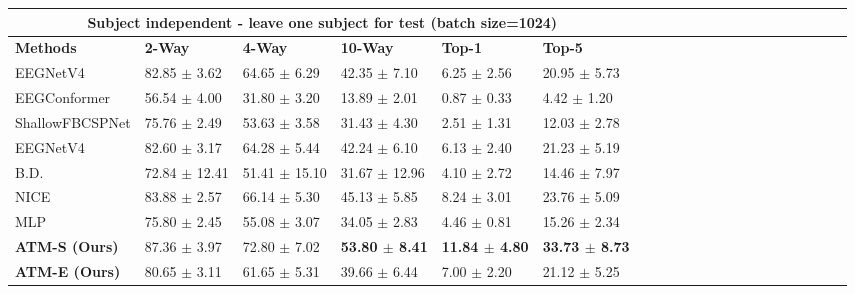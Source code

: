 \documentclass{article}
\begin{document}
\begin{table}[hp]
\begin{tabular}{l*{20}{p{1.50cm}}}
    
    \multicolumn{6}{c}{Subject independent - leave one subject for test (batch size=1024)} \\ \midrule
    \textbf{Methods} & \textbf{2-Way} & \textbf{4-Way} & \textbf{10-Way} & \textbf{Top-1} & \textbf{Top-5}\\ \midrule    
    EEGNetV4 & 82.85 $\pm$ 3.62 & 64.65 $\pm$ 6.29 & 42.35 $\pm$ 7.10 & 6.25 $\pm$ 2.56 & 20.95 $\pm$ 5.73 \\
    EEGConformer & 56.54 $\pm$ 4.00 & 31.80 $\pm$ 3.20 & 13.89 $\pm$ 2.01 & 0.87 $\pm$ 0.33 & 4.42 $\pm$ 1.20 \\
    ShallowFBCSPNet & 75.76 $\pm$ 2.49 & 53.63 $\pm$ 3.58 & 31.43 $\pm$ 4.30 & 2.51 $\pm$ 1.31 & 12.03 $\pm$ 2.78 \\
    EEGNetV4 & 82.60 $\pm$ 3.17 & 64.28 $\pm$ 5.44 & 42.24 $\pm$ 6.10 & 6.13 $\pm$ 2.40 & 21.23 $\pm$ 5.19 \\
    B.D. & 72.84 $\pm$ 12.41 & 51.41 $\pm$ 15.10 & 31.67 $\pm$ 12.96 & 4.10 $\pm$ 2.72 & 14.46 $\pm$ 7.97 \\
    NICE & 83.88 $\pm$ 2.57 & 66.14 $\pm$ 5.30 & 45.13 $\pm$ 5.85 & 8.24 $\pm$ 3.01 & 23.76 $\pm$ 5.09 \\
    MLP & 75.80 $\pm$ 2.45 & 55.08 $\pm$ 3.07 & 34.05 $\pm$ 2.83 & 4.46 $\pm$ 0.81 & 15.26 $\pm$ 2.34 \\
    \textbf{ATM-S  (Ours)} & 87.36 $\pm$ 3.97 & 72.80 $\pm$ 7.02 & \textbf{53.80 $\pm$ 8.41} & \textbf{11.84 $\pm$ 4.80 }& \textbf{33.73 $\pm$ 8.73} \\ 
    \textbf{ATM-E (Ours)} & 80.65 $\pm$ 3.11 & 61.65 $\pm$ 5.31 & 39.66 $\pm$ 6.44 & 7.00 $\pm$ 2.20 & 21.12 $\pm$ 5.25 \\
    \midrule
    
\bottomrule
\end{tabular}
\end{table}


\clearpage
\end{document}
